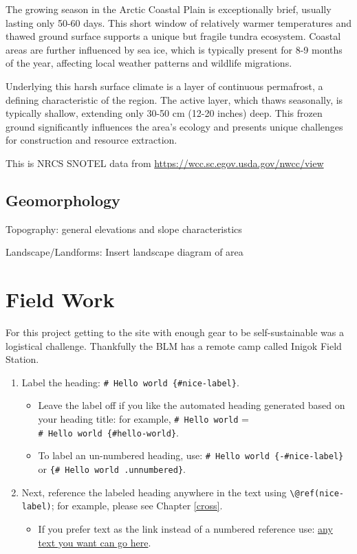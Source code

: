\documentclass[
]{book}
\providecommand{\tightlist}{%
  \setlength{\itemsep}{0pt}\setlength{\parskip}{0pt}}
\theoremstyle{definition}
\theoremstyle{definition}
\theoremstyle{definition}
\theoremstyle{definition}
\theoremstyle{remark}
\begin{document}
The growing season in the Arctic Coastal Plain is exceptionally brief, usually lasting only 50-60 days. This short window of relatively warmer temperatures and thawed ground surface supports a unique but fragile tundra ecosystem. Coastal areas are further influenced by sea ice, which is typically present for 8-9 months of the year, affecting local weather patterns and wildlife migrations.

Underlying this harsh surface climate is a layer of continuous permafrost, a defining characteristic of the region. The active layer, which thaws seasonally, is typically shallow, extending only 30-50 cm (12-20 inches) deep. This frozen ground significantly influences the area's ecology and presents unique challenges for construction and resource extraction.

\label{fig:unnamed-chunk-5}This is NRCS SNOTEL data from \url{https://wcc.sc.egov.usda.gov/nwcc/view}

\hypertarget{geomorphology}{%
\section{Geomorphology}\label{geomorphology}}

Topography: general elevations and slope characteristics

Landscape/Landforms: Insert landscape diagram of area

\hypertarget{field-work}{%
\chapter{Field Work}\label{field-work}}

For this project getting to the site with enough gear to be self-sustainable was a logistical challenge. Thankfully the BLM has a remote camp called Inigok Field Station.

\begin{enumerate}
\def\labelenumi{\arabic{enumi}.}
\tightlist
\item
  Label the heading: \texttt{\#\ Hello\ world\ \{\#nice-label\}}.

  \begin{itemize}
  \tightlist
  \item
    Leave the label off if you like the automated heading generated based on your heading title: for example, \texttt{\#\ Hello\ world} = \texttt{\#\ Hello\ world\ \{\#hello-world\}}.
  \item
    To label an un-numbered heading, use: \texttt{\#\ Hello\ world\ \{-\#nice-label\}} or \texttt{\{\#\ Hello\ world\ .unnumbered\}}.
  \end{itemize}
\item
  Next, reference the labeled heading anywhere in the text using \texttt{\textbackslash{}@ref(nice-label)}; for example, please see Chapter \ref{cross}.

  \begin{itemize}
  \tightlist
  \item
    If you prefer text as the link instead of a numbered reference use: \protect\hyperlink{cross}{any text you want can go here}.
  \end{itemize}
\end{enumerate}
\end{document}
